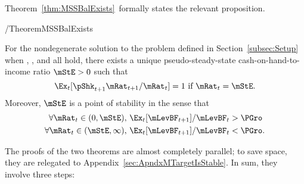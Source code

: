 \documentclass[ProjectDLO]{subfiles}
\begin{document}

Theorem~\ref{thm:MSSBalExists}~formally states the relevant proposition.
  \begin{verbatimwrite}{\EqDir/TheoremMSSBalExists}
\begin{theorem}\label{thm:MSSBalExists}
 For the nondegenerate solution to the problem defined in Section~\ref{subsec:Setup} when {\FVAC}, {\WRIC}, and {\GIC} all hold, there exists a unique pseudo-steady-state cash-on-hand-to-income ratio $\mStE>0$ such that
  \begin{equation}
    \Ex_t [\pShk_{t+1}{\mRat}_{t+1}/\mRat_t] = 1 \mbox{~if~} \mRat_t = \mStE.
    \label{eq:mStE}
  \end{equation}
  Moreover, $\mStE$ is a point of stability in the sense that
  \begin{align}\label{eq:stabilityStE}
    \forall {\mRat}_t\in(0,\mStE),      \,\,& \Ex_{t}[\mLevBF_{t+1}]/\mLevBF_{t} > \PGro \\
    \forall {\mRat}_t\in(\mStE,\infty), \,\,& \Ex_{t}[\mLevBF_{t+1}]/\mLevBF_{t} < \PGro. \notag
  \end{align}
\end{theorem}
\end{verbatimwrite}



The proofs of the two theorems are almost completely parallel; to save space, they are relegated to Appendix~\ref{sec:ApndxMTargetIsStable}.  In sum, they involve three steps:
\end{document}
